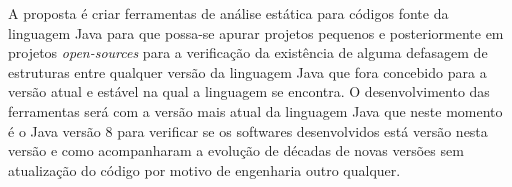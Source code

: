 A proposta é criar ferramentas de análise estática para códigos fonte da linguagem Java para que possa-se apurar projetos pequenos e posteriormente em projetos {\it open-sources} para a verificação da existência de alguma defasagem\cite{dyer2013large} de estruturas entre qualquer versão da linguagem Java que fora concebido para a versão atual e estável na qual a linguagem se encontra. O desenvolvimento das ferramentas será com a versão mais atual da linguagem Java que neste momento é o Java versão 8 para verificar se os softwares desenvolvidos está versão nesta versão e como acompanharam a evolução de décadas de novas versões sem atualização do código por motivo de engenharia outro qualquer.\\